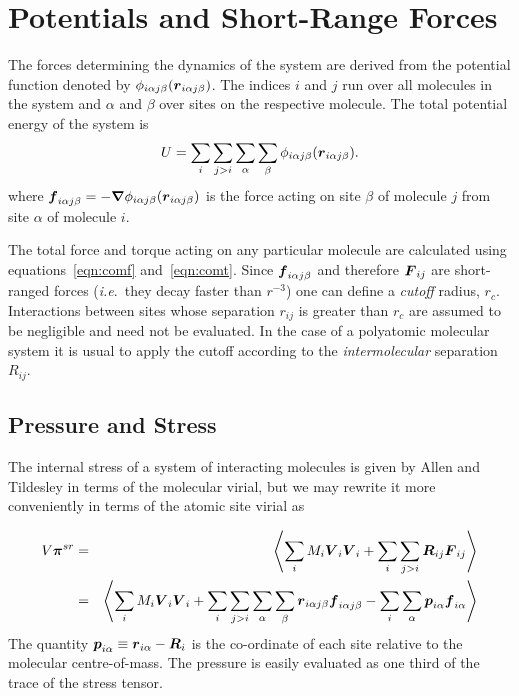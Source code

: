 \documentclass[twoside]{report}
\newcommand{\ie}{{\em i.e}.\ }
\newcommand{\bm}[1]{\mbox{\boldmath \protect\(#1\protect\)}}
\begin{document}
\section{Potentials and Short-Range Forces}%

The forces determining the dynamics of the system are derived from the
potential function denoted by $\phi_{i\alpha j\beta}(\bm{r} _{i\alpha
  j\beta})$.  The indices $i$ and $j$ run over all molecules in the
system and $\alpha$ and $\beta$ over sites on the respective molecule.
The total potential energy of the system is
\begin{equation}
\label{eqn:toten}
U = \sum_i \sum_{j > i} \sum_\alpha \sum_\beta \phi_{i\alpha j\beta}(
\bm{r}_{i\alpha j\beta}).
\end{equation}
where $\bm{f}_{i\alpha j\beta} = - \bm{\nabla} \phi_{i\alpha  j\beta}(
\bm{r}_{i\alpha j\beta})$ is the force acting on site $\beta$ of molecule
$j$ from site $\alpha$ of molecule $i$.

The total force and torque acting on any particular molecule are
calculated using equations~\ref{eqn:comf} and~\ref{eqn:comt}.  Since
$\bm{f}_{i\alpha j\beta}$ and therefore $\bm{F}_{ij}$ are short-ranged
forces (\ie  they decay faster than $r^{-3}$) one can define a {\em
cutoff\/} radius, $r_c$.  Interactions between sites whose separation
$r_{ij}$ is greater than $r_c$ are assumed to be negligible and need
not be evaluated.  In the case of a polyatomic molecular system it is
usual to apply the cutoff according to the {\em intermolecular\/}
separation $R_{ij}$.


\subsection{Pressure and Stress}
The internal stress of a system of interacting molecules is given by
Allen and Tildesley\cite[pp 46-49]{allen:87} in terms of the molecular
virial, but we may rewrite it more conveniently in terms of the atomic
site virial as

\begin{eqnarray}
\label{eqn:stress-sr}
V \bm{\pi}^{sr} & = & \left <  \sum_i M_i \bm{V}_i \bm{V}_i 
              + \sum_i \sum_{j>i} \bm{R}_{ij} \bm{F}_{ij} 
\right > \\ \nonumber
& = & \left < \sum_i M_i \bm{V}_i \bm{V}_i 
              + \sum_{i} \sum_{j>i} \sum_\alpha \sum_\beta 
                \bm{r}_{i\alpha j\beta}  \bm{f}_{i\alpha j\beta} 
              - \sum_i \sum_\alpha \bm{p}_{i\alpha} \bm{f}_{i\alpha}
\right >
\end{eqnarray}
The quantity $\bm{p}_{i\alpha} \equiv \bm{r}_{i\alpha} - \bm{R}_i$ is the
co-ordinate of each site relative to the molecular centre-of-mass.
The pressure is easily evaluated as one third of the trace of the
stress tensor. 
\end{document}

